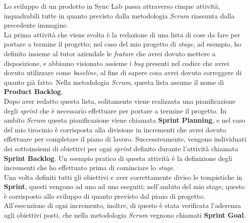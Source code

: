 Lo sviluppo di un prodotto in Sync Lab passa attraverso cinque attività, inquadrabili tutte in quanto previsto dalla metodologia \textit{Scrum} riassunta dalla precedente immagine. \\
La prima attività che viene svolta è la redazione di una lista di cose da fare per portare a termine il progetto; nel caso del mio progetto di \textit{stage}, ad esempio, ho definito insieme al tutor aziendale le \textit{feature} che avrei dovuto mettere a disposizione, e abbiamo visionato assieme i \textit{bug} presenti nel codice che avrei dovuto utilizzare come \textit{baseline}, al fine di sapere cosa avrei dovuto correggere di quanto già fatto. Nella metodologia \textit{Scrum}, questa lista assume il nome di \textbf{Product Backlog}. \\
Dopo aver redatto questa lista, solitamente viene realizzata una pianificazione degli \textit{sprint} che è necessario effettuare per portare a termine il progetto. In ambito \textit{Scrum} questa pianificazione viene chiamata \textbf{Sprint Planning}, e nel caso del mio tirocinio è corrisposta alla divisione in incrementi che avrei dovuto effettuare per completare il piano di lavoro. Successivamente, vengono individuati dei sottoinsiemi di obiettivi per ogni \textit{sprint} definito durante l'attività chiamata \textbf{Sprint Backlog}. Un esempio pratico di questa attività è la definizione degli incrementi che ho effettuato prima di cominciare lo \textit{stage}. \\
Una volta definiti tutti gli obiettivi e aver correttamente diviso le tempistiche in \textbf{Sprint}, questi vengono ad uno ad uno eseguiti; nell'ambito del mio stage, questo è corrisposto allo sviluppo di quanto previsto dal piano di progetto. All'esecuzione di ogni incremento, inoltre, di questo è stata verificata l'aderenza agli obiettivi posti, che nella metodologia \textit{Scrum} vegnono chiamati \textbf{Sprint Goal}.

